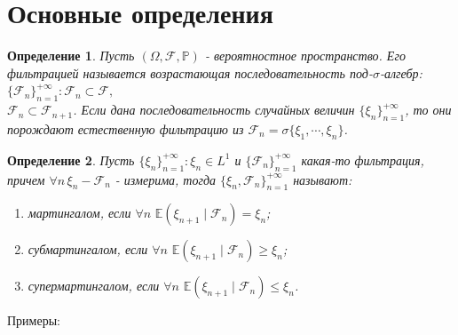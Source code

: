 \documentclass[12pt,a4paper]{article} %
\newtheorem{definition}{Определение}
\newcommand{\E}{\mathbb{E}}
\newcommand{\PR}{\mathbb{P}}
\newcommand{\F}{\mathcal{F}}
\begin{document}
	\section{Основные определения}
	\begin{definition}
		Пусть $(\Omega,\F,\PR)$ - вероятностное пространство. Его фильтрацией называется возрастающая последовательность под-$\sigma$-алгебр: $\{\F_n\}_{n=1}^{+\infty}:\F_n\subset\F,\,$\\$\F_n\subset\F_{n+1}$. Если дана последовательность случайных величин $\{\xi_n\}_{n=1}^{+\infty}$, то они порождают естественную фильтрацию из $\F_n=\sigma\{\xi_1,\cdots,\xi_n\}$.
	\end{definition}
	\begin{definition}
		Пусть $\{\xi_n\}_{n=1}^{+\infty}:\xi_n\in L^1$ и $\{\F_n\}_{n=1}^{+\infty}$ какая-то фильтрация, причем $\forall n\,\xi_n - \F_n$ - измерима, тогда $\{\xi_n,\F_n\}_{n=1}^{+\infty}$ называют:
		\begin{enumerate}
			\item мартингалом, если $\forall n\,\,\E(\xi_{n+1}\mid\F_n)=\xi_n$;
			\item субмартингалом, если $\forall n\,\,\E(\xi_{n+1}\mid\F_n)\geq\xi_n$;
			\item супермартингалом, если $\forall n\,\,\E(\xi_{n+1}\mid\F_n)\leq\xi_n$.
		\end{enumerate}
	\end{definition}
	Примеры:
\end{document}
